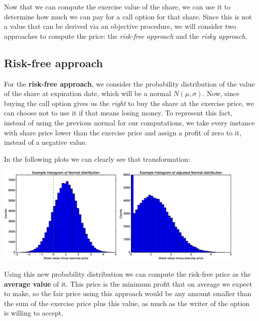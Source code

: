 \documentclass[8 pt]{article}
\begin{document}
Now that we can compute the exercise value of the share, we can use it to determine how much we can pay for a call option for that share. Since this is not a value that can be derived via an objective procedure, we will consider two approaches to compute the price: the \emph{risk-free approach} and the \emph{risky approach}.

\subsection{Risk-free approach}

For the \textbf{risk-free approach}, we consider the probability distribution of the value of the share at expiration date, which will be a normal $N(\mu, \sigma)$. Now, since buying the call option gives us the \emph{right} to buy the share at the exercise price, we can choose not to use it if that means losing money. To represent this fact, instead of using the previous normal for our computations, we take every instance with share price lower than the exercise price and assign a profit of zero to it, instead of a negative value.

In the following plots we can clearly see that transformation:

\begin{center}
  \includegraphics[width=0.45\textwidth]{graphs/ex-normal-1.eps}
  \includegraphics[width=0.45\textwidth]{graphs/ex-normal-2.eps}
\end{center}

Using this new probability distribution we can compute the risk-free price as the \textbf{average value} of it. This price is the minimum profit that on average we expect to make, so the fair price using this approach would be any amount smaller than the sum of the exercise price plus this value, as much as the writer of the option is willing to accept.
\end{document}
